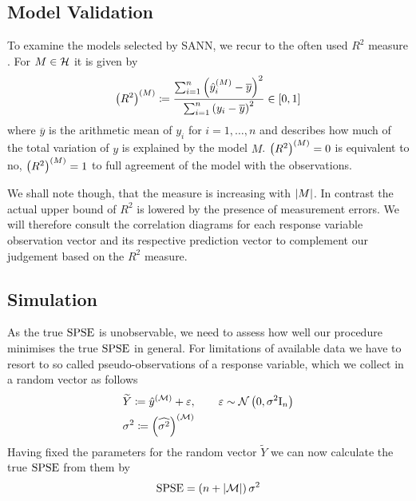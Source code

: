 		\medskip
		\begin{tcolorbox}[colframe=black,colbacktitle=white,coltitle=black, attach boxed title to top center={yshift=-2mm},enhanced, titlerule=0.1pt, boxrule=0.5pt, arc=5pt,title=Listing:\quad SANN algorithm]
			
		\end{tcolorbox}
		\medskip

		
	\subsection{Model Validation}
	\label{ssec:model-validation}
	
		To examine the models selected by SANN, we recur to the often used $R^2$ measure \cite[33-4]{draper:98a}.
		For $M\in\mathcal{H}$ it is given by
		\[
			\left( R^2 \right)^{(M)} \coloneqq \frac {\sum_{i=1}^n \left( \hat{y}^{(M)}_i - \overline{y} \right)^2}{\sum_{i=1}^n \left( y_i - \overline{y} \right)^2} \in [0,1]
		\]
		where $\overline{y}$ is the arithmetic mean of $y_i$ for $i=1,\ldots,n$ and describes how much of the total variation of $y$ is explained by the model $M$.
		$\left( R^2 \right)^{(M)} = 0$ is equivalent to no, $\left( R^2 \right)^{(M)} = 1$ to full agreement of the model with the observations.
		
		We shall note though, that the measure is increasing with $\left\vert M \right\vert$.
		In contrast the actual upper bound of $R^2$ is lowered by the presence of measurement errors.
		We will therefore consult the correlation diagrams for each response variable observation vector and its respective prediction vector to complement our judgement based on the $R^2$ measure.

	
	\subsection{Simulation}
	\label{ssec:simulation}
	
		As the true $\mathrm{SPSE}$ is unobservable, we need to assess how well our procedure minimises the true $\mathrm{SPSE}$ in general.
		For limitations of available data we have to resort to so called pseudo-observations of a response variable, which we collect in a random vector as follows
		\begin{alignat*}{3}
			&\widetilde{Y} \coloneqq \hat{y}^{(\mathcal{M})} + \varepsilon,\qquad \varepsilon \sim  \mathcal{N} \left( 0,\sigma^2\mathrm{I}_n \right) \\
			&\sigma^2 \coloneqq \left( \widehat{\sigma^2} \right)^{(\mathcal{M})}
		\end{alignat*}
		Having fixed the parameters for the random vector $\widetilde{Y}$ we can now calculate the true $\mathrm{SPSE}$ from them by
		\[
			\mathrm{SPSE} = \left(  n + \left\vert \mathcal{M} \right\vert  \right) \sigma^2
		\]
		
